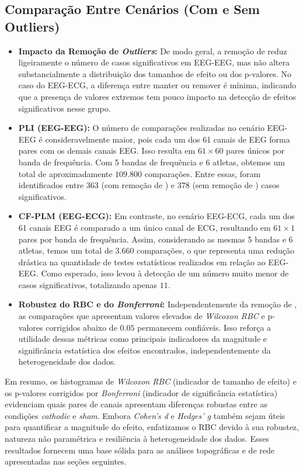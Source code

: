 \subsection{Comparação Entre Cenários (Com e Sem Outliers)}
\begin{itemize}
    \item \textbf{Impacto da Remoção de \textit{Outliers}:} De modo geral, a remoção de  reduz ligeiramente o número de casos significativos em EEG-EEG, mas não altera substancialmente a distribuição dos tamanhos de efeito ou dos p-valores. No caso do EEG-ECG, a diferença entre manter ou remover  é mínima, indicando que a presença de valores extremos tem pouco impacto na detecção de efeitos significativos nesse grupo.

    \item \textbf{PLI (EEG-EEG):} O número de comparações realizadas no cenário EEG-EEG é consideravelmente maior, pois cada um dos 61 canais de EEG forma pares com os demais canais EEG. Isso resulta em \( 61 \times 60 \) pares únicos por banda de frequência. Com 5 bandas de frequência e 6 atletas, obtemos um total de aproximadamente \( 109.800 \) comparações. Entre essas, foram identificados entre \( 363 \) (com remoção de ) e \( 378 \) (sem remoção de ) casos significativos.

    \item \textbf{CF-PLM (EEG-ECG):} Em contraste, no cenário EEG-ECG, cada um dos 61 canais EEG é comparado a um único canal de ECG, resultando em \( 61 \times 1 \) pares por banda de frequência. Assim, considerando as mesmas 5 bandas e 6 atletas, temos um total de \( 3.660 \) comparações, o que representa uma redução drástica na quantidade de testes estatísticos realizados em relação ao EEG-EEG. Como esperado, isso levou à detecção de um número muito menor de casos significativos, totalizando apenas \( 11 \).

    \item \textbf{Robustez do RBC e do \textit{Bonferroni}:} Independentemente da remoção de , as comparações que apresentam valores elevados de \textit{Wilcoxon RBC} e p-valores corrigidos abaixo de \( 0.05 \) permanecem confiáveis. Isso reforça a utilidade dessas métricas como principais indicadores da magnitude e significância estatística dos efeitos encontrados, independentemente da heterogeneidade dos dados.
\end{itemize}

Em resumo, os histogramas de \textit{Wilcoxon RBC} (indicador de tamanho de efeito) e os p-valores corrigidos por \textit{Bonferroni} (indicador de significância estatística) evidenciam quais pares de canais apresentam diferenças robustas entre as condições \textit{cathodic} e \textit{sham}. Embora \textit{Cohen's d} e \textit{Hedges' g} também sejam úteis para quantificar a magnitude do efeito, enfatizamos o RBC devido à sua robustez, natureza não paramétrica e resiliência à heterogeneidade dos dados. Esses resultados fornecem uma base sólida para as análises topográficas e de rede apresentadas nas seções seguintes.

